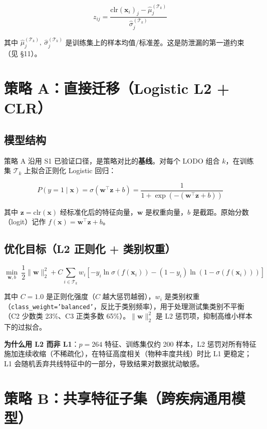 \documentclass{internal-report}
\begin{document}
$$
z_{ij} = \frac{\text{clr}(\mathbf{x}_i)_j - \hat{\mu}_j^{(\mathcal{T}_k)}}{\hat{\sigma}_j^{(\mathcal{T}_k)}}
$$

其中 $\hat{\mu}_j^{(\mathcal{T}_k)},\ \hat{\sigma}_j^{(\mathcal{T}_k)}$ 是训练集上的样本均值/标准差。这是防泄漏的第一道约束（见 §11）。

\section{策略 A：直接迁移（Logistic L2 + CLR）}

\subsection{模型结构}

策略 A 沿用 S1 已验证口径，是策略对比的\textbf{基线}。对每个 LODO 组合 $k$，在训练集 $\mathcal{T}_k$ 上拟合正则化 Logistic 回归：

$$
P(y=1 \mid \mathbf{x}) = \sigma\!\left(\mathbf{w}^{\top}\mathbf{z} + b\right) = \frac{1}{1+\exp\!\left(-\left(\mathbf{w}^{\top}\mathbf{z}+b\right)\right)}
$$

其中 $\mathbf{z}=\text{clr}(\mathbf{x})$ 经标准化后的特征向量，$\mathbf{w}$ 是权重向量，$b$ 是截距。原始分数（logit）记作 $f(\mathbf{x})=\mathbf{w}^{\top}\mathbf{z}+b$。

\subsection{优化目标（L2 正则化 + 类别权重）}

$$
\min_{\mathbf{w},b}\ \frac{1}{2}\|\mathbf{w}\|_2^2 + C \sum_{i\in\mathcal{T}_k} w_i \left[ -y_i\ln\sigma(f(\mathbf{x}_i)) - (1-y_i)\ln\!\left(1-\sigma(f(\mathbf{x}_i))\right) \right]
$$

其中 $C=1.0$ 是正则化强度（$C$ 越大惩罚越弱），$w_i$ 是类别权重（\texttt{class\_weight='balanced'}，反比于类别频率），用于处理测试集类别不平衡（C2 少数类 23\%、C3 正类多数 65\%）。$\|\mathbf{w}\|_2^2$ 是 L2 惩罚项，抑制高维小样本下的过拟合。

\textbf{为什么用 L2 而非 L1}：$p=264$ 特征、训练集仅约 200 样本，L2 惩罚对所有特征施加连续收缩（不稀疏化），在特征高度相关（物种丰度共线）时比 L1 更稳定；L1 会随机丢弃共线特征中的一部分，导致结果对数据扰动敏感。

\section{策略 B：共享特征子集（跨疾病通用模型）}
\end{document}
